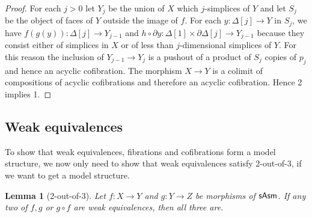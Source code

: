 \documentclass{amsart}
\theoremstyle{plain}
\newtheorem{lemma}[theorem]{Lemma}
\theoremstyle{definition}
\newcommand\hide[1]{}
\newcommand\id{\mathrm{id}}
\begin{document}
{\begin{proof}
For each $j>0$ let $Y_j$ be the union of $X$ which $j$-simplices of $Y$ and let $S_j$ be the object of faces of $Y$ outside the image of $f$. For each $y:\Delta[j]\to Y$ in $S_j$, we have $f(g(y)):\Delta[j]\to Y_{j-1}$ and $h\circ \partial y:\Delta[1]\times \partial \Delta[j]\to Y_{j-1}$ because they consist either of simplices in $X$ or of less than $j$-dimensional simplices of $Y$. For this reason the inclusion of $Y_{j-1}\to Y_j$ is a pushout of a product of $S_j$ copies of $p_j$ and hence an acyclic cofibration. The morphism $X\to Y$ is a colimit of compositions of acyclic cofibrations and therefore an acyclic cofibration. Hence 2 implies 1.


\hide{For standard reasons the morphisms $d_i:Y^{\Delta[1]}\to Y$ defined by compositions with the acyclic cofibrations $\Delta\delta^1_i:1 \to \Delta[1]$ are acyclic fibrations. Thanks to the homotopy $h$, $g$ is a retract of $d_1$ and hence an acyclic fibration. Hence 2 implies 3.
\[\xymatrix{
Y\ar[d]_g \ar[r]_{h^t}\ar@/^2ex/[rr]^\id & Y^{\Delta[1]} \ar[r]_{d_0}\ar[d]_{d_1} & Y\ar[d]^g \\
X\ar[r]^f \ar@/_2ex/[rr]_\id & Y\ar[r]^g & X
}\]

Assume 3.} 

\end{proof}
}

\subsection{Weak equivalences}
To show that weak equivalences, fibrations and cofibrations form a model structure, we now only need to show that weak equivalences satisfy $2$-out-of-$3$, if we want to get a model structure.

\begin{lemma}[2-out-of-3] Let $f:X\to Y$ and $g:Y\to Z$ be morphisms of $\mathsf{sAsm}$. If any two of $f,g$ or $g\circ f$ are weak equivalences, then all three are. \end{lemma}
\end{document}
